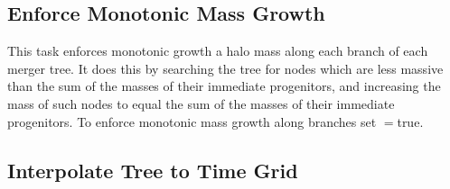 \subsection{Enforce Monotonic Mass Growth}

This task enforces monotonic growth a halo mass along each branch of each merger tree. It does this by searching the tree for nodes which are less massive than the sum of the masses of their immediate progenitors, and increasing the mass of such nodes to equal the sum of the masses of their immediate progenitors. To enforce monotonic mass growth along branches set {\normalfont \ttfamily [mergerTreeEnforceMonotonicGrowth]}$=${\normalfont \ttfamily true}.

\subsection{Interpolate Tree to Time Grid}\label{sec:MergerTreeTimeRegrid}

